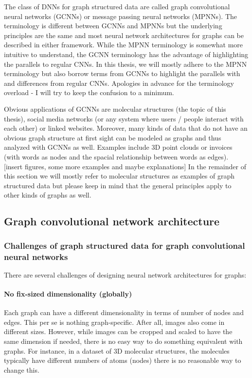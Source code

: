 The class of DNNs for graph structured data are called graph convolutional neural networks (GCNNs) or message passing neural networks (MPNNs). The terminology is different between GCNNs and MPNNs but the underlying principles are the same and most neural network architectures for graphs can be described in either framework. While the MPNN terminology is somewhat more intuitive to understand, the GCNN terminology has the advantage of highlighting the parallels to regular CNNs. In this thesis, we will mostly adhere to the MPNN terminology but also borrow terms from GCNNs to highlight the parallels with and differences from regular CNNs. Apologies in advance for the terminology overload - I will try to keep the confusion to a minimum.

Obvious applications of GCNNs are molecular structures (the topic of this thesis), social media networks (or any system where users / people interact with each other) or linked websites. Moreover, many kinds of data that do not have an obvious graph structure at first sight can be modeled as graphs and thus analyzed with GCNNs as well. Examples include 3D point clouds or invoices (with words as nodes and the spacial relationship between words as edges).
[insert figures, some more examples and maybe explanations]
In the remainder of this section we will mostly refer to molecular structures as examples of graph structured data but please keep in mind that the general principles apply to other kinds of graphs as well.

\subsection{Graph convolutional network architecture}

\subsubsection{Challenges of graph structured data for graph convolutional neural networks}
\label{sec:graph-challenges}

There are several challenges of designing neural network architectures for graphs:

\paragraph{No fix-sized dimensionality (globally)}
Each graph can have a different dimensionality in terms of number of nodes and edges. This per se is nothing graph-specific. After all, images also come in different sizes. However, while images can be cropped and scaled to have the same dimension if needed, there is no easy way to do something equivalent with graphs. For instance, in a dataset of 3D molecular structures, the molecules typically have different numbers of atoms (nodes) there is no reasonable way to change this.
